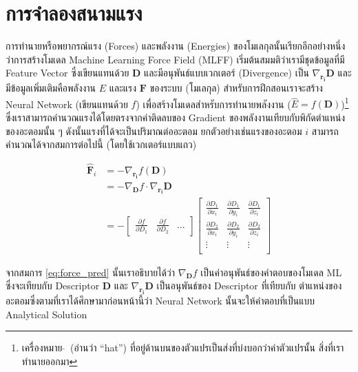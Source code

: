 \section{การจำลองสนามแรง}
\label{sec:model_ff}

การทำนายหรือพยากรณ์แรง (Forces) และพลังงาน (Energies) ของโมเลกุลนั้นเรียกอีกอย่างหนึ่งว่าการสร้างโมเดล Machine Learning 
Force Field (MLFF) เริ่มต้นสมมติว่าเรามีชุดข้อมูลที่มี Feature Vector ซึ่งเขียนแทนด้วย $\mathbf{D}$ และมีอนุพันธ์แบบเวกเตอร์ 
(Divergence) เป็น $\nabla_{\mathbf{r_i}} \mathbf{D}$ และมีข้อมูลเพิ่มเติมคือพลังงาน $E$ และแรง $\mathbf{F}$ ของระบบ 
(โมเลกุล) สำหรับการฝึกสอนเราจะสร้าง Neural Network (เขียนแทนด้วย $f$) เพื่อสร้างโมเดลสำหรับการทำนายพลังงาน ($\hat{E} = 
f(\mathbf{D})$)\footnote{เครื่องหมาย $\hat{}$\, (อ่านว่า \enquote{hat}) ที่อยู่ด้านบนของตัวแปรเป็นส่งที่บ่งบอกว่าค่าตัวแปรนั้น%
สิ่งที่เราทำนายออกมา} ซึ่งเราสามารถคำนวณแรงได้โดยตรงจากค่าติดลบของ Gradient ของพลังงานเทียบกับพิกัดตำแหน่งของอะตอมนั้น ๆ 
ดังนั้นแรงที่ได้จะเป็นปริมาณต่ออะตอม ยกตัวอย่างเช่นแรงของอะตอม $i$ สามารถคำนวณได้จากสมการต่อไปนี้ (โดยใช้เวกเตอร์แบบแถว)

\begin{align}\label{eq:force_pred}
\hat{\mathbf{F}}_i &= - \nabla_{\mathbf{r_i}} f(\mathbf{D}) \\
&= - \nabla_{\mathbf{D}} f \cdot \nabla_{\mathbf{r_i}} \mathbf{D}\\
&= - \begin{bmatrix}
    \frac{\partial f}{\partial D_1} & \frac{\partial f}{\partial D_2} & \dots
\end{bmatrix}
\begin{bmatrix}
    \frac{\partial D_1}{\partial x_i} & \frac{\partial D_1}{\partial y_i} & \frac{\partial D_1}{\partial z_i}\\
    \frac{\partial D_2}{\partial x_i} & \frac{\partial D_2}{\partial y_i} & \frac{\partial D_2}{\partial z_i}\\
    \vdots & \vdots & \vdots \\
\end{bmatrix}
\end{align}

\noindent จากสมการ \ref{eq:force_pred} นั้นเราอธิบายได้ว่า $\nabla_{\mathbf{D}} f$ เป็นค่าอนุพันธ์ของคำตอบของโมเดล ML 
ซึ่งจะเทียบกับ Descriptor $\mathbf{D}$ และ $\nabla_{\mathbf{r_i}} \mathbf{D}$ เป็นอนุพันธ์ของ Descriptor ที่เทียบกับ%
ตำแหน่งของอะตอมซึ่งตามที่เราได้ศึกษามาก่อนหน้านี้ว่า Neural Network นั้นจะให้คำตอบที่เป็นแบบ Analytical Solution

